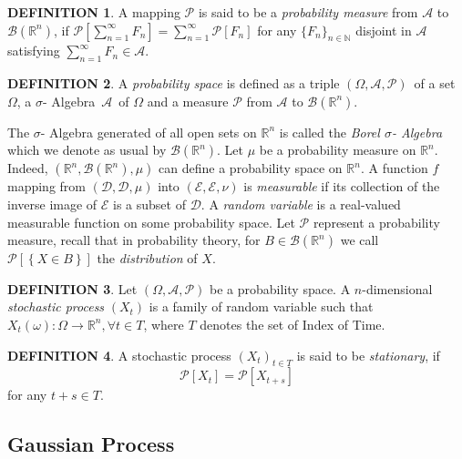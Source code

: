 \documentclass[a4paper, twoside, 11pt]{article}
\theoremstyle{definition}
\newtheorem{definition}{DEFINITION}[section]
\def\AA{$\mathscr{A}$\ }
\def\sa{$\sigma$- Algebra\ }
\def\bs{$(\Omega, \mathscr{A}, \mathcal{P})$\ }
\def\bsigma{\mathscr{B}\brkt{\mathbb{R}^{n}}}
\newcommand{\sqbr}[1]{\left[ {#1} \right]}
\newcommand{\brkt}[1]{\left({#1} \right)}
\begin{document}
\begin{definition}
  A mapping $\mathcal{P}$ is said to be a \emph{probability measure} from $\mathscr{A}$ to $\bsigma$, if $\mathcal{P}\sqbr{\sum_{n=1}^{\infty} F_n} = \sum_{n=1}^{\infty} \mathcal{P}\sqbr{F_n}$ for any $\{F_n\}_{n \in \mathbb{N}}$ disjoint in $\mathscr{A}$ satisfying $\sum_{n=1}^{\infty}F_n \in \mathscr{A}$. 
\end{definition}

\begin{definition}
  A \emph{probability space} is defined as a triple \bs of a set $\Omega$, a \sa \AA  of $\Omega$ and a measure $\mathcal{P}$ from $\mathscr{A}$ to $\bsigma$.
\end{definition}

The $\sigma$- Algebra generated of all open sets on $\mathbb{R}^{n}$ is called the \emph{Borel $\sigma$- Algebra} which we denote as usual by $\mathscr{B}\left(\mathbb{R}^{n}\right)$. Let $\mu$ be a probability measure on $\mathbb{R}^{n}$. Indeed, $\brkt{\mathbb{R}^{n}, \mathscr{B}\brkt{\mathbb{R}^{n}}, \mu}$ can define a probability space on $\mathbb{R}^{n}$. A function $f$ mapping from $\brkt{\mathcal{D}, \mathscr{D}, \mu}$ into $\brkt{\mathcal{E}, \mathscr{E}, \nu}$ is \emph{measurable} if its collection of the inverse image of $\mathscr{E}$ is a subset of $\mathscr{D}$. A \emph{random variable} is a real-valued measurable function on some probability space. Let $\mathcal{P}$ represent a probability measure, recall that in probability theory, for $B \in \bsigma$ we call $\mathcal{P}\sqbr{\left\{X \in B\right\}}$ the \emph{distribution} of $X$.

\begin{definition}
  Let $\brkt{\Omega, \mathscr{A}, \mathcal{P}}$ be a probability space. A $n$-dimensional \emph{stochastic process} $\brkt{X_t}$ is a family of random variable such that $X_t\brkt{\omega} : \Omega \longrightarrow  \mathbb{R}^{n},  \forall t \in T$, where $T$ denotes the set of Index of Time.    
\end{definition}

\begin{definition}
  A stochastic process $\brkt{X_t}_{t \in T}$ is said to be \emph{stationary}, if  
\[
  \mathcal{P}\sqbr{X_t} = \mathcal{P}\sqbr{X_{t+s}} 
\]
for any $t+s \in T$. 
\end{definition}

\subsection{Gaussian Process}
\newpage
\end{document}
